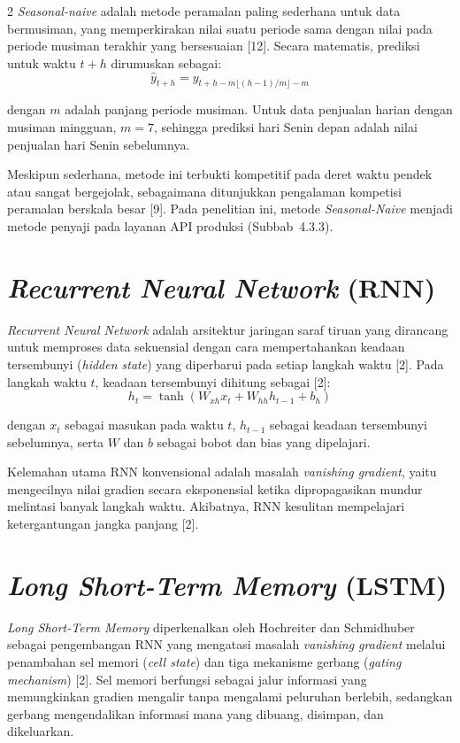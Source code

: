 \documentclass[12pt, a4paper, onecolumn, oneside]{report}
\begin{document}
\begin{spacing}{2}
\textit{Seasonal-naive} adalah metode peramalan paling sederhana untuk data bermusiman, yang memperkirakan nilai suatu periode sama dengan nilai pada periode musiman terakhir yang bersesuaian [12]. Secara matematis, prediksi untuk waktu $t+h$ dirumuskan sebagai:
\begin{equation}
    \hat{y}_{t+h} = y_{t+h-m\lfloor (h-1)/m \rfloor - m}
\end{equation}

\noindent dengan $m$ adalah panjang periode musiman. Untuk data penjualan harian dengan musiman mingguan, $m = 7$, sehingga prediksi hari Senin depan adalah nilai penjualan hari Senin sebelumnya.

Meskipun sederhana, metode ini terbukti kompetitif pada deret waktu pendek atau sangat bergejolak, sebagaimana ditunjukkan pengalaman kompetisi peramalan berskala besar [9]. Pada penelitian ini, metode \textit{Seasonal-Naive} menjadi metode penyaji pada layanan API produksi (Subbab~4.3.3).

\section{\textit{Recurrent Neural Network} (RNN)}

\textit{Recurrent Neural Network} adalah arsitektur jaringan saraf tiruan yang dirancang untuk memproses data sekuensial dengan cara mempertahankan keadaan tersembunyi (\textit{hidden state}) yang diperbarui pada setiap langkah waktu [2]. Pada langkah waktu $t$, keadaan tersembunyi dihitung sebagai [2]:
\begin{equation}
    h_t = \tanh(W_{xh} x_t + W_{hh} h_{t-1} + b_h)
\end{equation}

\noindent dengan $x_t$ sebagai masukan pada waktu $t$, $h_{t-1}$ sebagai keadaan tersembunyi sebelumnya, serta $W$ dan $b$ sebagai bobot dan bias yang dipelajari.

Kelemahan utama RNN konvensional adalah masalah \textit{vanishing gradient}, yaitu mengecilnya nilai gradien secara eksponensial ketika dipropagasikan mundur melintasi banyak langkah waktu. Akibatnya, RNN kesulitan mempelajari ketergantungan jangka panjang [2].

\section{\textit{Long Short-Term Memory} (LSTM)}

\textit{Long Short-Term Memory} diperkenalkan oleh Hochreiter dan Schmidhuber sebagai pengembangan RNN yang mengatasi masalah \textit{vanishing gradient} melalui penambahan sel memori (\textit{cell state}) dan tiga mekanisme gerbang (\textit{gating mechanism}) [2]. Sel memori berfungsi sebagai jalur informasi yang memungkinkan gradien mengalir tanpa mengalami peluruhan berlebih, sedangkan gerbang mengendalikan informasi mana yang dibuang, disimpan, dan dikeluarkan.


\end{spacing}
\end{document}
